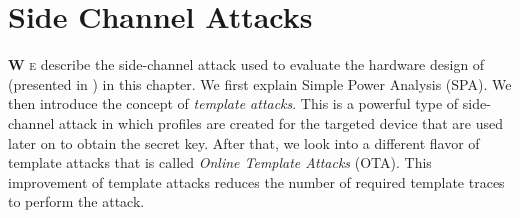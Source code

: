 \chapter{Side Channel Attacks} \label{chp: Side Channel Attacks}
\lettrine[lhang = 0.4, findent=-30pt, lines=4]{\textbf{
		\initfamily \fontsize{20mm}{20mm} \selectfont W
		\normalfont}}{e} 
describe the side-channel attack used to evaluate the hardware design of {\fourq} (presented in \cite{jarvinen2016four}) in this chapter. 
We first explain Simple Power Analysis (SPA).
We then introduce the concept of \emph{template attacks}.
This is a powerful type of side-channel attack in which profiles are created for the targeted device that are used later on to obtain the secret key.
After that, we look into a different flavor of template attacks that is called \emph{Online Template Attacks} (OTA). 
This improvement of template attacks reduces the number of required template traces to perform the attack.



